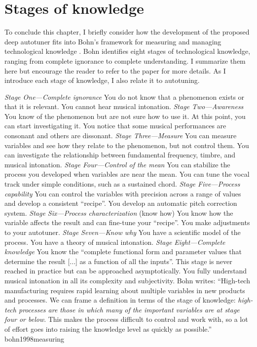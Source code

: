\section{Stages of knowledge}
To conclude this chapter, I briefly consider how the development of the proposed deep autotuner fits into Bohn's framework for measuring and managing technological knowledge \cite{bohn1998measuring}. Bohn identifies eight stages of technological knowledge, ranging from complete ignorance to complete understanding. I summarize them here but encourage the reader to refer to the paper for more details. As I introduce each stage of knowledge, I also relate it to autotuning.

\textit{Stage One---Complete ignorance} You do not know that a phenomenon exists or that it is relevant. You cannot hear musical intonation.
\textit{Stage Two---Awareness} You know of the phenomenon but are not sure how to use it. At this point, you can start investigating it. You notice that some musical performances are consonant and others are dissonant.
\textit{Stage Three---Measure}
You can measure variables and see how they relate to the phenomenon, but not control them. You can investigate the relationship between fundamental frequency, timbre, and musical intonation.
\textit{Stage Four---Control of the mean}
You can stabilize the process you developed when variables are near the mean. You can tune the vocal track under simple conditions, such as a sustained chord. 
\textit{Stage Five---Process capability}
You can control the variables with precision across a range of values and develop a consistent ``recipe''. You develop an automatic pitch correction system.
\textit{Stage Six---Process characterization} (know how)
You know how the variable affects the result and can fine-tune your ``recipe''. You make adjustments to your autotuner.
\textit{Stage Seven---Know why}
You have a scientific model of the process. You have a theory of musical intonation. 
\textit{Stage Eight---Complete knowledge}
You know the ``complete functional form and parameter values that determine the result [...] as a function of all the inputs''. This stage is never reached in practice but can be approached asymptotically. You fully understand musical intonation in all its complexity and subjectivity. 
Bohn writes: ``High-tech manufacturing requires rapid learning about multiple variables in new products and processes. We can frame a definition in terms of the stage of knowledge: \textit{high-tech processes are those in which many of the important variables are at stage four or below}. This makes the process difficult to control and work with, so a lot of effort goes into raising the knowledge level as quickly as possible.'' {bohn1998measuring}

